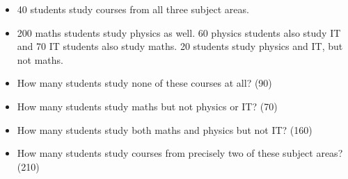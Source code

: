 \begin{itemize}
	\item 40 students study courses from all three subject
	areas. 
	\item 200 maths students study physics as well. 60 physics students
	also study IT and 70 IT students also study maths. 20 students study physics and IT, but not maths.
\end{itemize}



\begin{itemize}
	\item How many students study none of these courses at all? (90)
	
	\item How many students study maths but not physics or IT? (70)
	
	\item How many students study both maths and physics but not IT? (160)
	
	\item How many students study courses from precisely two of these subject
	areas? (210)
\end{itemize}






